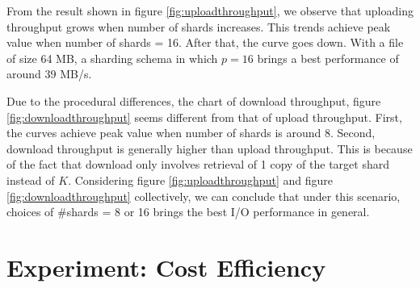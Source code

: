 From the result shown in figure \ref{fig:uploadthroughput}, we observe that uploading throughput grows when number of shards increases. This trends achieve peak value when number of shards = 16. After that, the curve goes down. With a file of size 64 MB, a sharding schema in which $p=16$ brings a best performance of around 39 MB/s.

Due to the procedural differences, the chart of download throughput, figure \ref{fig:downloadthroughput} seems different from that of upload throughput. First, the curves achieve peak value when number of shards is around 8. Second, download throughput is generally higher than upload throughput. This is because of the fact that download only involves retrieval of 1 copy of the target shard instead of $K$. Considering figure \ref{fig:uploadthroughput} and figure \ref{fig:downloadthroughput} collectively, we can conclude that under this scenario, choices of \#shards = 8 or 16 brings the best I/O performance in general.

\section{Experiment: Cost Efficiency}
\label{s:expcostefficiency}